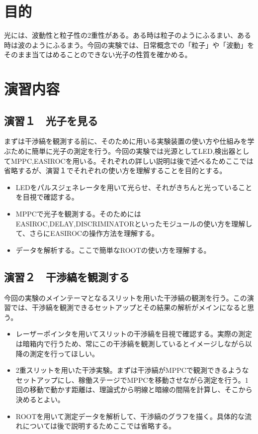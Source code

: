 \documentclass[10pt]{ujarticle}
\begin{document}
\tableofcontents
\clearpage

\section{目的}
光には、波動性と粒子性の2重性がある。ある時は粒子のようにふるまい、ある時は波のようにふるまう。今回の実験では、日常概念での「粒子」や「波動」をそのまま当てはめることのできない光子の性質を確かめる。

\section{演習内容}

\subsection{演習１　光子を見る}
まずは干渉縞を観測する前に、そのために用いる実験装置の使い方や仕組みを学ぶために簡単に光子の測定を行う。今回の実験では光源としてLED,検出器としてMPPC,EASIROCを用いる。それぞれの詳しい説明は後で述べるためここでは省略するが、演習１でそれぞれの使い方を理解することを目的とする。
\begin{itemize}
\item LEDをパルスジェネレータを用いて光らせ、それがきちんと光っていることを目視で確認する。
\item MPPCで光子を観測する。そのためにはEASIROC,DELAY,DISCRIMINATORといったモジュールの使い方を理解して、さらにEASIROCの操作方法を理解する。
\item データを解析する。ここで簡単なROOTの使い方を理解する。
\end{itemize}

\subsection{演習２　干渉縞を観測する}
今回の実験のメインテーマとなるスリットを用いた干渉縞の観測を行う。この演習では、干渉縞を観測できるセットアップとその結果の解析がメインになると思う。
\begin{itemize}
\item レーザーポインタを用いてスリットの干渉縞を目視で確認する。実際の測定は暗箱内で行うため、常にこの干渉縞を観測しているとイメージしながら以降の測定を行ってほしい。
\item 2重スリットを用いた干渉実験。まずは干渉縞がMPPCで観測できるようなセットアップにし、稼働ステージでMPPCを移動させながら測定を行う。1回の移動で動かす距離は、理論式から明線と暗線の間隔を計算し、そこから決めるとよい。
\item ROOTを用いて測定データを解析して、干渉縞のグラフを描く。具体的な流れについては後で説明するためここでは省略する。　
\end{itemize}
\end{document}
